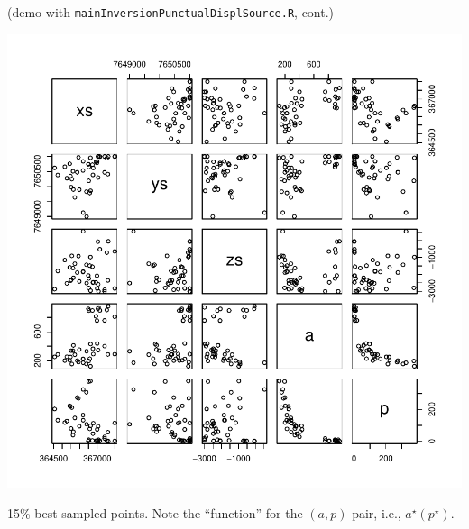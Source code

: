 \documentclass{beamer}
\begin{document}
\begin{frame}{}
\small (demo with \texttt{mainInversionPunctualDisplSource.R}, cont.)
\begin{minipage}[c]{0.6\textwidth}
\begin{center}
\includegraphics[width=\textwidth]{figures/pairs_X_good_15percent} 
\end{center}
\end{minipage}
\hspace{0.3cm}
\begin{minipage}[c]{0.3\textwidth}
15\% best sampled points. Note the ``function'' for the $(a,p)$ pair, i.e., $a^\star(p^\star)$.
\end{minipage}
\end{frame}
\end{document}
